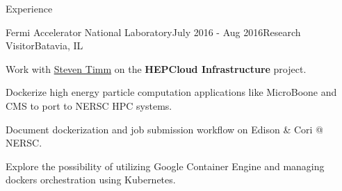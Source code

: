 \documentclass{resume} %
\begin{document}
\begin{rSection}{Experience}

\begin{rSubsection}{Fermi Accelerator National Laboratory}{July 2016 - Aug 2016}{Research Visitor}{Batavia, IL}
\item Work with \href{http://home.fnal.gov/~timm/}{Steven Timm} on the \textbf{HEPCloud Infrastructure} project.
\item Dockerize high energy particle computation applications like MicroBoone and CMS to port to NERSC HPC systems.
\item Document dockerization and job submission workflow on Edison \& Cori @ NERSC.
\item Explore the possibility of utilizing Google Container Engine and managing dockers orchestration using Kubernetes.
\end{rSubsection}


\end{rSection}

\end{document}
